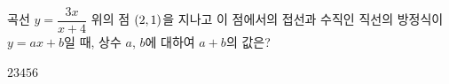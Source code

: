 곡선 $y=\dfrac{3x}{x+4}$ 위의 점 $(2{,}\mkern3mu\mathopen{}1)$을 지나고 이 점에서의 접선과 수직인 직선의 방정식이 $y=ax+b$일 때, 상수 $a$, $b$에 대하여 $a+b$의 값은?
\begin{choices32}{$2$}{$3$}{$4$}{$5$}{$6$}\end{choices32}
